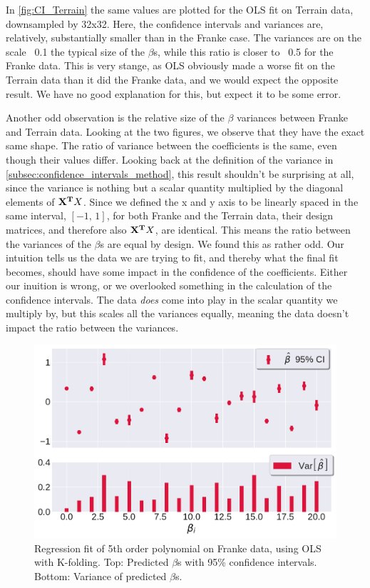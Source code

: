 \documentclass[10pt, twocolumn]{article}
\begin{document}
In \cref{fig:CI_Terrain} the same values are plotted for the OLS fit on Terrain data, downsampled by 32x32. Here, the confidence intervals and variances are, relatively, substantially smaller than in the Franke case. The variances are on the scale ~0.1 the typical size of the $\beta$s, while this ratio is closer to ~0.5 for the Franke data. This is very stange, as OLS obviously made a worse fit on the Terrain data than it did the Franke data, and we would expect the opposite result. We have no good explanation for this, but expect it to be some error.

Another odd observation is the relative size of the $\beta$ variances between Franke and Terrain data. Looking at the two figures, we observe that they have the exact same shape. The ratio of variance between the coefficients is the same, even though their values differ. Looking back at the definition of the variance in \cref{subsec:confidence_intervals_method}, this result shouldn't be surprising at all, since the variance is nothing but a scalar quantity multiplied by the diagonal elements of $\vb{X^T}X$. Since we defined the x and y axis to be linearly spaced in the same interval, $[-1,\, 1]$, for both Franke and the Terrain data, their design matrices, and therefore also $\vb{X^T}X$, are identical. This means the ratio between the variances of the $\beta$s are equal by design. We found this as rather odd. Our intuition tells us the data we are trying to fit, and thereby what the final fit becomes, should have some impact in the confidence of the coefficients. Either our inuition is wrong, or we overlooked something in the calculation of the confidence intervals. The data \textit{does} come into play in the scalar quantity we multiply by, but this scales all the variances equally, meaning the data doesn't impact the ratio between the variances.

\begin{figure}[h!]
    \centering
    \includegraphics[scale=0.4]{../figs/CI_Franke.pdf}
    \caption{Regression fit of 5th order polynomial on Franke data, using OLS with K-folding. Top: Predicted $\beta$s with 95\% confidence intervals. Bottom: Variance of predicted $\beta$s.}
    \label{fig:CI_Franke}
\end{figure}
\end{document}
